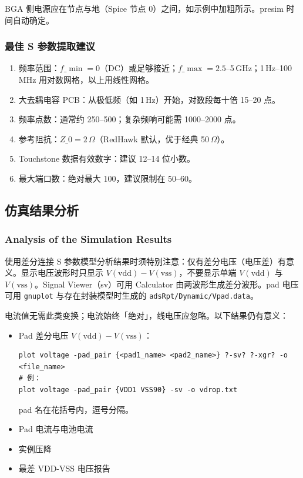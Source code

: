 \begin{noteBox}
BGA 侧电源应在节点与地（Spice 节点 0）之间，如示例中加粗所示。presim 时间自动确定。
\end{noteBox}

\subsubsection{最佳 S 参数提取建议}
\begin{enumerate}
  \item 频率范围：$f\_{\min}=0$（DC）或足够接近；$f\_{\max}=2.5$--5\,GHz；1\,Hz--100\,MHz 用对数网格，以上用线性网格。
  \item 大去耦电容 PCB：从极低频（如 1\,Hz）开始，对数段每十倍 15--20 点。
  \item 频率点数：通常约 250--500；复杂频响可能需 1000--2000 点。
  \item 参考阻抗：$Z\_0=2\,\Omega$（RedHawk 默认，优于经典 50\,$\Omega$）。
  \item Touchstone 数据有效数字：建议 12--14 位小数。
  \item 最大端口数：绝对最大 100，建议限制在 50--60。
\end{enumerate}

\subsection{仿真结果分析}
\subsubsection*{Analysis of the Simulation Results}

使用差分连接 S 参数模型分析结果时须特别注意：仅有差分电压（电压差）有意义。显示电压波形时只显示 $V(\mathrm{vdd})-V(\mathrm{vss})$，不要显示单端 $V(\mathrm{vdd})$ 与 $V(\mathrm{vss})$。Signal Viewer（sv）可用 Calculator 由两波形生成差分波形。pad 电压可用 \texttt{gnuplot} 与存在封装模型时生成的 \texttt{adsRpt/Dynamic/Vpad.data}。

电流值无需此类变换；电流始终「绝对」，线电压应忽略。以下结果仍有意义：
\begin{itemize}
  \item Pad 差分电压 $V(\mathrm{vdd})-V(\mathrm{vss})$：
\begin{lstlisting}
plot voltage -pad_pair {<pad1_name> <pad2_name>} ?-sv? ?-xgr? -o <file_name>
# 例：
plot voltage -pad_pair {VDD1 VSS90} -sv -o vdrop.txt
\end{lstlisting}
  pad 名在花括号内，逗号分隔。
  \item Pad 电流与电池电流
  \item 实例压降
  \item 最差 VDD-VSS 电压报告
\end{itemize}

